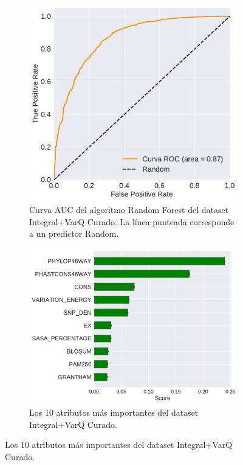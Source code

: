 \newpage
\begin{figure}[H]
\centering
\begin{subfigure}[b]{0.7\textwidth}
    \centering
    \includegraphics[width=\textwidth]{documents/latex/figures/3/integral_varq/auc_varq_integral.pdf}
    \caption{Curva AUC del algoritmo Random Forest del dataset Integral+VarQ Curado. La línea punteada corresponde a un predictor Random.}
    \label{fig:auc_integral_varq}
\end{subfigure}
\hfill
\hfill
\begin{subfigure}[b]{0.7\textwidth}
    \centering
    \includegraphics[width=\textwidth]{documents/latex/figures/3/integral_varq/importances_varq_integral.pdf}
    \caption{Los 10 atributos más importantes del dataset Integral+VarQ Curado.}
    \label{fig:importances_integral_varq}
\end{subfigure}
\end{figure}
